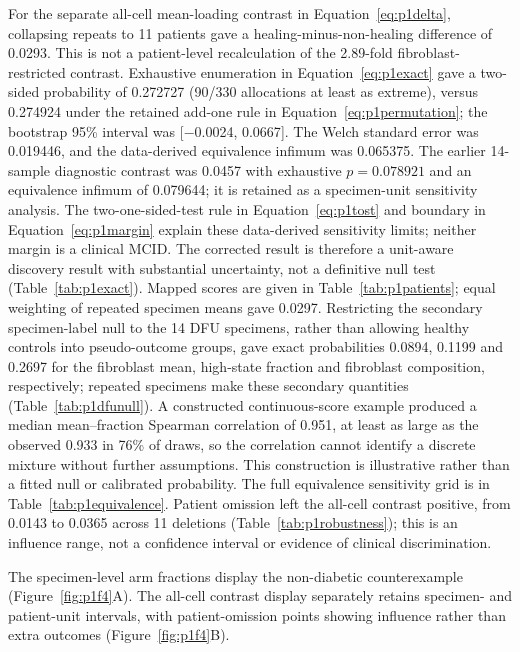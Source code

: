 For the separate all-cell mean-loading contrast in Equation~\eqref{eq:p1delta}, collapsing repeats to 11 patients gave a healing-minus-non-healing difference of 0.0293. This is not a patient-level recalculation of the 2.89-fold fibroblast-restricted contrast. Exhaustive enumeration in Equation~\eqref{eq:p1exact} gave a two-sided probability of 0.272727 (90/330 allocations at least as extreme), versus 0.274924 under the retained add-one rule in Equation~\eqref{eq:p1permutation}; the bootstrap 95\% interval was {[}−0.0024, 0.0667{]}. The Welch standard error was 0.019446, and the data-derived equivalence infimum was 0.065375. The earlier 14-sample diagnostic contrast was 0.0457 with exhaustive $p=0.078921$ and an equivalence infimum of 0.079644; it is retained as a specimen-unit sensitivity analysis. The two-one-sided-test rule in Equation~\eqref{eq:p1tost} and boundary in Equation~\eqref{eq:p1margin} explain these data-derived sensitivity limits; neither margin is a clinical MCID. The corrected result is therefore a unit-aware discovery result with substantial uncertainty, not a definitive null test (Table~\ref{tab:p1exact}). Mapped scores are given in Table~\ref{tab:p1patients}; equal weighting of repeated specimen means gave 0.0297. Restricting the secondary specimen-label null to the 14 DFU specimens, rather than allowing healthy controls into pseudo-outcome groups, gave exact probabilities 0.0894, 0.1199 and 0.2697 for the fibroblast mean, high-state fraction and fibroblast composition, respectively; repeated specimens make these secondary quantities (Table~\ref{tab:p1dfunull}). A constructed continuous-score example produced a median mean--fraction Spearman correlation of 0.951, at least as large as the observed 0.933 in 76\% of draws, so the correlation cannot identify a discrete mixture without further assumptions. This construction is illustrative rather than a fitted null or calibrated probability. The full equivalence sensitivity grid is in Table~\ref{tab:p1equivalence}. Patient omission left the all-cell contrast positive, from 0.0143 to 0.0365 across 11 deletions (Table~\ref{tab:p1robustness}); this is an influence range, not a confidence interval or evidence of clinical discrimination.

The specimen-level arm fractions display the non-diabetic counterexample (Figure~\ref{fig:p1f4}A\label{call:p1f4}). The all-cell contrast display separately retains specimen- and patient-unit intervals, with patient-omission points showing influence rather than extra outcomes (Figure~\ref{fig:p1f4}B).

